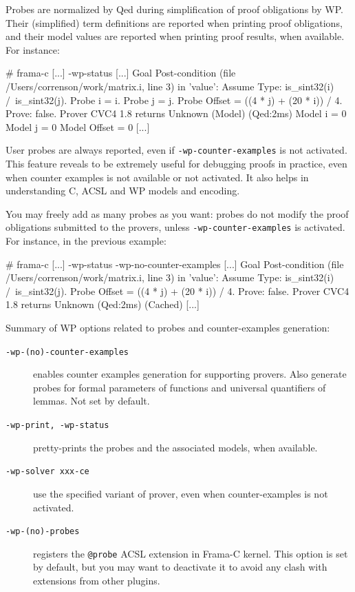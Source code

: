 Probes are normalized by \textsf{Qed} during simplification of proof obligations
by \textsf{WP}. Their (simplified) term definitions are reported when printing
proof obligations, and their model values are reported when printing proof
results, when available. For instance:

\begin{shell}
  # frama-c [...] -wp-status
  [...]
  Goal Post-condition (file /Users/correnson/work/matrix.i, line 3) in 'value':
  Assume {
    Type: is_sint32(i) /\ is_sint32(j).
    Probe i = i.
    Probe j = j.
    Probe Offset = ((4 * j) + (20 * i)) / 4.
  }
  Prove: false.
  Prover CVC4 1.8 returns Unknown (Model) (Qed:2ms)
  Model i = 0
  Model j = 0
  Model Offset = 0
  [...]
\end{shell}

User probes are always reported, even if \verb+-wp-counter-examples+ is not
activated. This feature reveals to be extremely useful for debugging proofs in
practice, even when counter examples is not available or not activated. It also
helps in understanding \textsf{C}, \textsf{ACSL} and \textsf{WP} models and
encoding.

You may freely add as many probes as you want: probes do not modify the
proof obligations submitted to the provers, unless \verb+-wp-counter-examples+
is activated. For instance, in the previous example:

\begin{shell}
  # frama-c [...] -wp-status -wp-no-counter-examples
  [...]
  Goal Post-condition (file /Users/correnson/work/matrix.i, line 3) in 'value':
  Assume {
    Type: is_sint32(i) /\ is_sint32(j).
    Probe Offset = ((4 * j) + (20 * i)) / 4.
  }
  Prove: false.
  Prover CVC4 1.8 returns Unknown (Qed:2ms) (Cached)
  [...]
\end{shell}

\noindent
Summary of \textsf{WP} options related to probes and counter-examples generation:
\begin{description}
\item[\tt -wp-(no)-counter-examples] enables counter examples generation for
  supporting provers. Also generate probes for formal parameters of functions
  and universal quantifiers of lemmas. Not set by default.
\item[\tt -wp-print, -wp-status] pretty-prints the probes and the associated models,
  when available.
\item[\tt -wp-solver xxx-ce] use the specified variant of prover, even
  when counter-examples is not activated.
\item[\tt -wp-(no)-probes] registers the \verb+@probe+ \textsf{ACSL}
  extension in \textsf{Frama-C} kernel.
  This option is set by default, but you may want to deactivate it to
  avoid any clash with extensions from other plugins.
\end{description}


